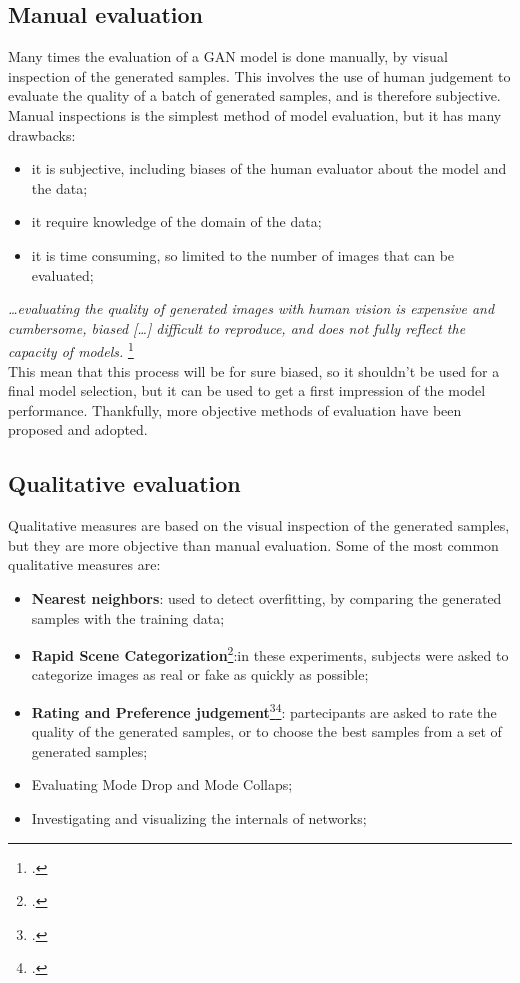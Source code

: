 \subsection{Manual evaluation}
\label{subsec:manual-evaluation}
Many times the evaluation of a GAN model is done manually, by visual inspection of the generated samples.
This involves the use of human judgement to evaluate the quality of a batch of generated samples, and is therefore subjective.
Manual inspections is the simplest method of model evaluation, but it has many drawbacks:
\begin{itemize}
    \item it is subjective, including biases of the human evaluator about the model and the data;
    \item it require knowledge of the domain of the data;
    \item it is time consuming, so limited to the number of images that can be evaluated;
\end{itemize}
\emph{…evaluating the quality of generated images with human vision is expensive and cumbersome, biased […] difficult to reproduce, and does not fully reflect the capacity of models.}
\footcite{paper:ganeval}\\
This mean that this process will be for sure biased, so it shouldn't be used for a final model selection,
 but it can be used to get a first impression of the model performance.
Thankfully, more objective methods of evaluation have been proposed and adopted.
\subsection{Qualitative evaluation}
\label{subsec:qualitative-evaluation}
Qualitative measures are based on the visual inspection of the generated samples, but they are more objective than manual evaluation.
Some of the most common qualitative measures are:
\begin{itemize}
    \item \textbf{Nearest neighbors}: used to detect overfitting, by comparing the generated samples with the training data;
    \item \textbf{Rapid Scene Categorization}\footcite{paper:rapidscenecat}:in these experiments, subjects were asked to categorize images as real or fake as quickly as possible;
    \item \textbf{Rating and Preference judgement}\footcite{paper:stackadvnet}\footcite{paper:stackadvnet1}: 
    partecipants are asked to rate the quality of the generated samples, or to choose the best samples from a set of generated samples;
    \item Evaluating Mode Drop and Mode Collaps;
    \item Investigating and visualizing the internals of networks;
\end{itemize}

